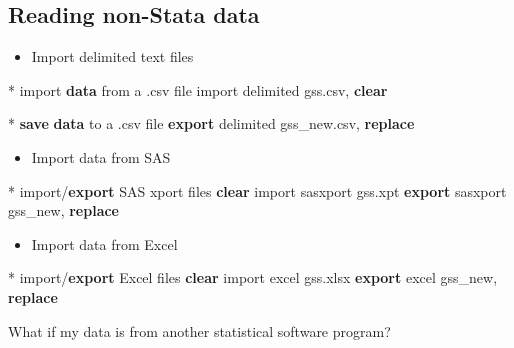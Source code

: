 \documentclass[
]{book}
\newenvironment{Shaded}{\begin{snugshade}}{\end{snugshade}}
\newcommand{\KeywordTok}[1]{\textcolor[rgb]{0.13,0.29,0.53}{\textbf{#1}}}
\newcommand{\NormalTok}[1]{#1}
\providecommand{\tightlist}{%
  \setlength{\itemsep}{0pt}\setlength{\parskip}{0pt}}
\begin{document}
\hypertarget{reading-non-stata-data}{%
\subsection{Reading non-Stata data}\label{reading-non-stata-data}}

\begin{itemize}
\tightlist
\item
  Import delimited text files
\end{itemize}

\begin{Shaded}
\begin{Highlighting}[]
\NormalTok{* import }\KeywordTok{data}\NormalTok{ from a .csv file}
\NormalTok{import delimited gss.csv, }\KeywordTok{clear}

\NormalTok{* }\KeywordTok{save} \KeywordTok{data}\NormalTok{ to a .csv file}
\KeywordTok{export}\NormalTok{ delimited gss_new.csv, }\KeywordTok{replace}
\end{Highlighting}
\end{Shaded}

\begin{itemize}
\tightlist
\item
  Import data from SAS
\end{itemize}

\begin{Shaded}
\begin{Highlighting}[]
\NormalTok{* import/}\KeywordTok{export}\NormalTok{ SAS xport files}
\KeywordTok{clear}
\NormalTok{import sasxport gss.xpt}
\KeywordTok{export}\NormalTok{ sasxport gss_new, }\KeywordTok{replace}
\end{Highlighting}
\end{Shaded}

\begin{itemize}
\tightlist
\item
  Import data from Excel
\end{itemize}

\begin{Shaded}
\begin{Highlighting}[]
\NormalTok{* import/}\KeywordTok{export}\NormalTok{ Excel files}
\KeywordTok{clear}
\NormalTok{import excel gss.xlsx}
\KeywordTok{export}\NormalTok{ excel gss_new, }\KeywordTok{replace}
\end{Highlighting}
\end{Shaded}

What if my data is from another statistical software program?
\end{document}
